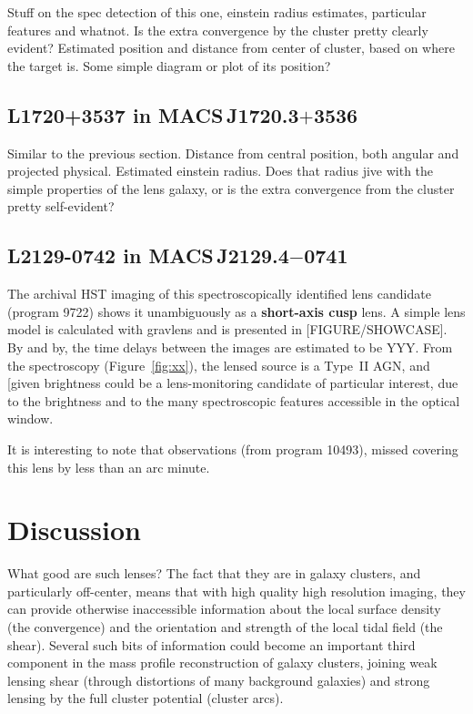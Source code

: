 \message{ !name(clashresolved.tex)}\documentclass{emulateapj}
\begin{document}
Stuff on the spec detection of this one, einstein radius estimates,
particular features and whatnot. Is the extra convergence by the
cluster pretty clearly evident? Estimated position and distance from
center of cluster, based on where the target is. Some simple diagram
or plot of its position?

\subsection{L1720+3537 in MACS\,J1720.3$+$3536}

Similar to the previous section. Distance from central position, both
angular and projected physical. Estimated einstein radius. Does that
radius jive with the simple properties of the lens galaxy, or is the
extra convergence from the cluster pretty self-evident?

\subsection{L2129-0742 in MACS\,J2129.4$-$0741}

The archival HST imaging of this spectroscopically identified lens
candidate (program 9722) shows it unambiguously as a {\bf short-axis
  cusp} lens.  A simple lens model is calculated with gravlens
\citep{keeton:01} and is presented in [FIGURE/SHOWCASE]. By and by,
the time delays between the images are estimated to be YYY. From the
spectroscopy (Figure~\ref{fig:xx}), the lensed source is a Type~II
AGN, and [given brightness could be a lens-monitoring candidate of
particular interest, due to the brightness and to the many
spectroscopic features accessible in the optical window. 

It is interesting to note that observations (from program 10493), missed
covering this lens by less than an arc minute.  

\section{Discussion}

What good are such lenses? The fact that they are in galaxy clusters,
and particularly off-center, means that with high quality high
resolution imaging, they can provide otherwise inaccessible
information about the local surface density (the convergence) and the
orientation and strength of the local tidal field (the shear). Several
such bits of information could become an important third component in
the mass profile reconstruction of galaxy clusters, joining weak
lensing shear (through distortions of many background galaxies) and
strong lensing by the full cluster potential (cluster arcs).  
\end{document}
